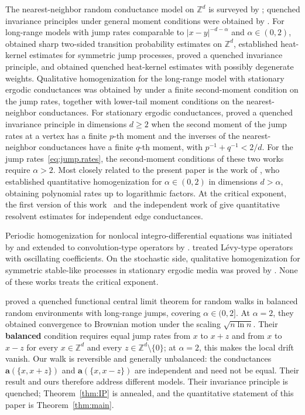 \documentclass[11pt]{amsart}
\numberwithin{equation}{section}
\newcommand{\Z}{\mathbb{Z}}
\newcommand{\ba}{\mathbf{a}}
\begin{document}
The nearest-neighbor random conductance model on $\Z^d$ is surveyed by \citet{Biskup2011}; quenched invariance principles under general moment conditions were obtained by \citet*{AndresDeuschelSlowik2015}.
For long-range models with jump rates comparable to $|x-y|^{-d-\alpha}$ and $\alpha \in (0,2)$, \citet{BassLevin2002} obtained sharp two-sided transition probability estimates on $\Z^d$, \citet{ChenKumagai2008} established heat-kernel estimates for symmetric jump processes, \citet*{CKW2021} proved a quenched invariance principle, and \citet*{ChenKumagaiWang2020} obtained quenched heat-kernel estimates with possibly degenerate weights.
Qualitative homogenization for the long-range model with stationary ergodic conductances was obtained by \citet*{FlegelHeidaSlowik2019} under a finite second-moment condition on the jump rates, together with lower-tail moment conditions on the nearest-neighbor conductances.
For stationary ergodic conductances, \citet*{BCKW2021} proved a quenched invariance principle in dimensions $d \geq 2$ when the second moment of the jump rates at a vertex has a finite $p$-th moment and the inverses of the nearest-neighbor conductances have a finite $q$-th moment, with $p^{-1} + q^{-1} < 2/d$.
For the jump rates~\eqref{eq:jump.rates}, the second-moment conditions of these two works require $\alpha > 2$.
Most closely related to the present paper is the work of \citet*{CCKW2025}, who established quantitative homogenization for $\alpha \in (0,2)$ in dimensions $d > \alpha$, obtaining polynomial rates up to logarithmic factors.
At the critical exponent, the first version of this work~\citep{BD2026} and the independent work of \citet*{CGW2026} give quantitative resolvent estimates for independent edge conductances.

Periodic homogenization for nonlocal integro-differential equations was initiated by \citet{Schwab2010} and extended to convolution-type operators by \citet{PiatnitskiZhizhina2017}.
\citet*{KassmannPiatnitskiZhizhina2019} treated L\'evy-type operators with oscillating coefficients.
On the stochastic side, qualitative homogenization for symmetric stable-like processes in stationary ergodic media was proved by \citet*{ChenChenKumagaiWang2021SIAM}.
None of these works treats the critical exponent.

\citet*{CCKW2021} proved a quenched functional central limit theorem for random walks in balanced random environments with long-range jumps, covering $\alpha \in (0,2]$.
At $\alpha = 2$, they obtained convergence to Brownian motion under the scaling $\sqrt{n \ln n}$.
Their \textbf{balanced} condition requires equal jump rates from $x$ to $x+z$ and from $x$ to $x-z$ for every $x \in \Z^d$ and every $z \in \Z^d \setminus \{0\}$; at $\alpha = 2$, this makes the local drift vanish.
Our walk is reversible and generally unbalanced: the conductances $\ba(\{x,x+z\})$ and $\ba(\{x,x-z\})$ are independent and need not be equal.
Their result and ours therefore address different models.
Their invariance principle is quenched; Theorem~\ref{thm:IP} is annealed, and the quantitative statement of this paper is Theorem~\ref{thm:main}.
\end{document}
